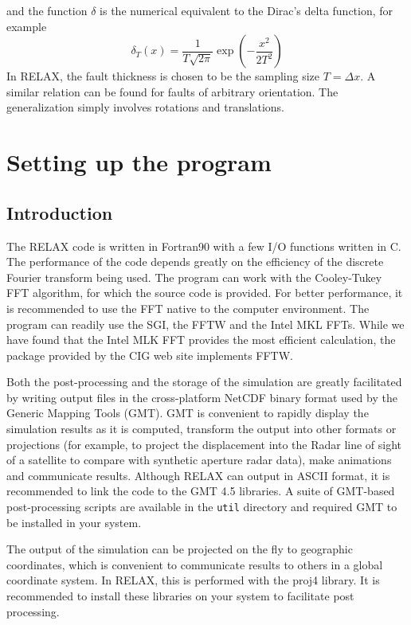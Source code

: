 \documentclass[10pt]{article}
\begin{document}
and the function $\delta$ is the numerical equivalent to the Dirac's delta function, for example
\begin{equation}
\delta_T(x)=\frac{1}{T\sqrt{2\pi}}\exp\!\left(-\frac{x^2}{2T^2}\right)
\end{equation}
In RELAX, the fault thickness is chosen to be the sampling size $T=\Delta x$. A similar relation can be found for faults of arbitrary orientation. The generalization simply involves rotations and translations. 

\pagebreak
\section{Setting up the program}

\subsection{Introduction}
The RELAX code is written in Fortran90 with a few I/O functions written in C. The performance of the code depends greatly on the efficiency of the discrete Fourier transform being used. The program can work with the Cooley-Tukey FFT algorithm, for which the source code is provided. For better performance, it is recommended to use the FFT native to the computer environment. The program can readily use the SGI, the FFTW and the Intel MKL FFTs. While we have found that the Intel MLK FFT provides the most efficient calculation, the package provided by the CIG web site implements FFTW.

Both the post-processing and the storage of the simulation are greatly facilitated by writing output files in the cross-platform NetCDF binary format used by the Generic Mapping Tools (GMT). GMT is convenient to rapidly display the simulation results as it is computed, transform the output into other formats or projections (for example, to project the displacement into the Radar line of sight of a satellite to compare with synthetic aperture radar data), make animations and communicate results. Although RELAX can output in ASCII format, it is recommended to link the code to the GMT 4.5 libraries. A suite of GMT-based post-processing scripts are available in the \verb`util` directory and required GMT to be installed in your system.

The output of the simulation can be projected on the fly to geographic coordinates, which is convenient to communicate results to others in a global coordinate system. In RELAX, this is performed with the proj4 library. It is recommended to install these libraries on your system to facilitate post processing.
\end{document}
